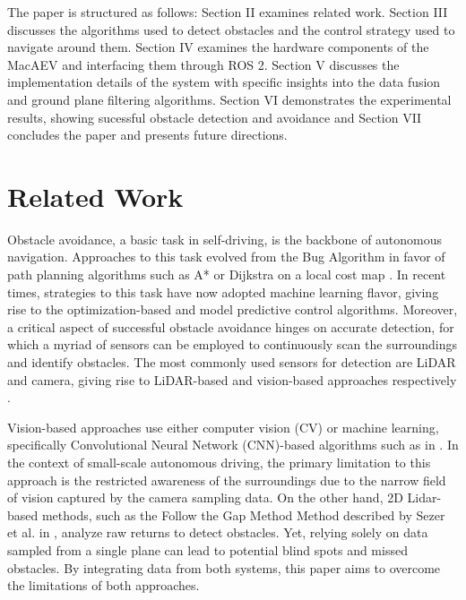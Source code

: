 \documentclass[conference]{IEEEtran}
\begin{document}

The paper is structured as follows: Section II examines related work. Section III discusses the 
algorithms used to detect obstacles and the control strategy used to navigate around them. Section IV examines the hardware components of the MacAEV and interfacing them through ROS 2. Section V discusses the implementation details of the system with specific insights into the data fusion and ground plane filtering algorithms. Section VI demonstrates the experimental results, showing sucessful obstacle detection and avoidance and Section VII concludes the paper and presents future directions. 


\section{Related Work}
Obstacle avoidance, a basic task in self-driving, is the backbone of autonomous navigation. Approaches to this task evolved from the Bug Algorithm in favor of path planning algorithms such as A* or Dijkstra on a local cost map \cite{b1}. In recent times, strategies to this task have now adopted machine learning flavor, giving rise to the optimization-based and model predictive control algorithms.    
Moreover, a critical aspect of successful obstacle avoidance hinges on accurate detection, for which a myriad of sensors can be employed to continuously scan the surroundings and identify obstacles. The most commonly used sensors for detection are LiDAR and camera, giving rise to LiDAR-based and vision-based approaches respectively \cite{b2}. 

Vision-based approaches use either computer vision (CV) or machine learning, specifically Convolutional Neural Network (CNN)-based algorithms such as in \cite{b3}. In the context of small-scale autonomous driving, the primary limitation to this approach is the restricted awareness of the surroundings due to the narrow field of vision captured by the camera sampling data. On the other hand, 2D Lidar-based methods, such as the Follow the Gap Method Method described by Sezer et al. in \cite{b4}, analyze raw returns to detect obstacles. Yet, relying solely on data sampled from a single plane can lead to potential blind spots and missed obstacles. By integrating data from both systems, this paper aims to overcome the limitations of both approaches.
\end{document}
